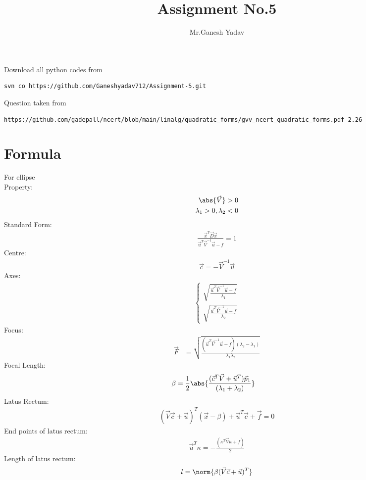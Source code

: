 \documentclass[journal,12pt,twocolumn]{IEEEtran}
\begin{document}
\def\rightbox#1{\makebox[0in][r]{#1}}
\def\centbox#1{\makebox[0in]{#1}}
\def\topbox#1{\raisebox{-\baselineskip}[0in][0in]{#1}}
\def\midbox#1{\raisebox{-0.5\baselineskip}[0in][0in]{#1}}
\vspace{3cm}
\title{Assignment No.5}
\author{Mr.Ganesh Yadav}
\maketitle
\newpage
\bigskip
\renewcommand{\thefigure}{\theenumi}
\renewcommand{\thetable}{\theenumi}
Download all python codes from
\begin{lstlisting}
svn co https://github.com/Ganeshyadav712/Assignment-5.git
\end{lstlisting}
%
Question taken from
\begin{lstlisting}
https://github.com/gadepall/ncert/blob/main/linalg/quadratic_forms/gvv_ncert_quadratic_forms.pdf-2.26
\end{lstlisting}
\section{Formula}
\begin{lemma}
For ellipse\\
Property:
\begin{align}
    \abs{\vec{V}} > 0
    \\
    \lambda_1>0,\lambda_2<0
\end{align}
Standard Form:
\begin{align}
    \frac{\vec{x}^T\vec{D}\vec{x}}{\vec{u}^T\vec{V}^{-1}\vec{u}-f}=1 \label{eq1}
\end{align}
Centre:
\begin{align}
    \vec{c} = -\vec{V}^{-1}\vec{u}
\end{align}
Axes:
\begin{align}
\begin{cases}
    \sqrt{\frac{\vec{u}^T\vec{V}^{-1}\vec{u}-f}{\lambda_1}}
    \\
    \sqrt{\frac{\vec{u}^T\vec{V}^{-1}\vec{u}-f}{\lambda_2}}
\end{cases}
\end{align}
Focus:
\begin{align}
    \vec{F} &= \sqrt{\frac{(\vec{u}^T\vec{V}^{-1}\vec{u}-f)(\lambda_2-\lambda_1)}{\lambda_1\lambda_2}}
\end{align}
Focal Length:
\begin{align}
    \beta &= \frac{1}{2}\abs{\frac{(\vec{c}^T\vec{V}+\vec{u}^T)\vec{p}_1}{(\lambda_1+\lambda_2)}} 
\end{align}
Latus Rectum:
\begin{align}
    (\vec{V}\vec{c}+\vec{u})^T(\vec{x} -\beta) + \vec{u}^T\vec{c} + \vec{f} = 0
\end{align}
End points of latus rectum:
\begin{align}
    \vec{u}^T\kappa = -\frac{(\kappa^T\vec{V}\kappa + f )}{2}
\end{align}
Length of latus rectum:
\begin{align}
   l=\norm{\beta(\vec{V}\vec{c}+\vec{u})^T} 
\end{align}
\end{lemma}
\end{document}
